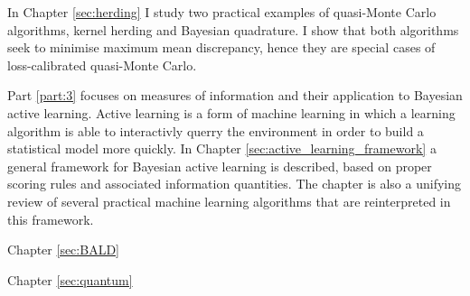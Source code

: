 In Chapter \ref{sec:herding} I study two practical examples of quasi-Monte Carlo algorithms, kernel herding and Bayesian quadrature. I show that both algorithms seek to minimise maximum mean discrepancy, hence they are special cases of loss-calibrated quasi-Monte Carlo. 

Part \ref{part:3} focuses on measures of information and their application to Bayesian active learning. Active learning is a form of machine learning in which a learning algorithm is able to interactivly querry the environment in order to build a statistical model more quickly. In Chapter \ref{sec:active_learning_framework} a general framework for Bayesian active learning is described, based on proper scoring rules and associated information quantities. The chapter is also a unifying review of several practical machine learning algorithms that are reinterpreted in this framework.

Chapter \ref{sec:BALD} 

Chapter \ref{sec:quantum}